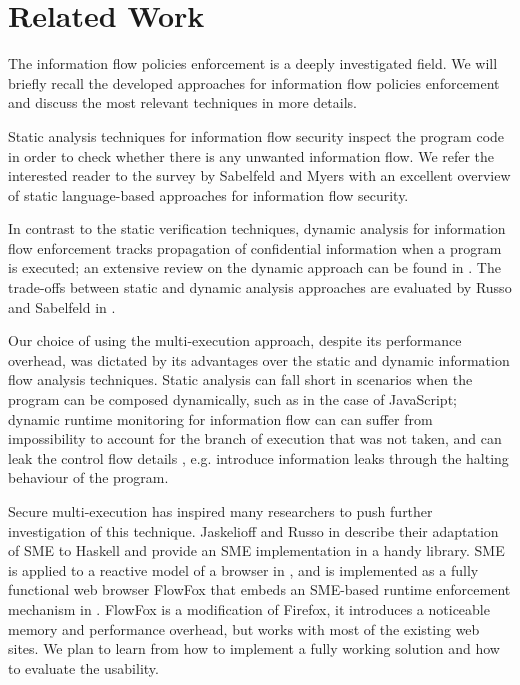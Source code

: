 \documentclass[10pt,a4paper,oneside]{article}
\begin{document}
\section{Related Work}\label{sec:relwork}
The information flow policies enforcement is a deeply investigated field. We will briefly recall the developed approaches for information flow policies enforcement and discuss the most relevant techniques in more details.

Static analysis techniques for information flow security inspect the program code in order to check whether there is any unwanted information flow. We refer the interested reader to the survey by Sabelfeld and Myers \cite{Sabe-Myer-2003} with an excellent overview of static language-based approaches for information flow security.








In contrast to the static verification techniques, dynamic analysis for information flow enforcement tracks propagation of confidential information when a program is executed;  an extensive review on the dynamic approach can be found in \cite{LeGu-07}. The trade-offs between static and dynamic analysis approaches are evaluated by Russo and Sabelfeld in \cite{Russ-Sabe-10-CSF}. 







Our choice of using the multi-execution approach, despite its performance overhead, was dictated by its advantages over the static and dynamic information flow analysis techniques. Static analysis can fall short in scenarios when the program can be composed dynamically, such as in the case of JavaScript; dynamic runtime monitoring for information flow can can suffer from impossibility to account for the branch of execution that was not taken, and can leak the control flow details \cite{Sabe-Myer-2003}, e.g. introduce information leaks through the halting behaviour of the program. 


Secure multi-execution \cite{Devr-Pies-10-IEEESP} has inspired many researchers to push further investigation of this technique. Jaskelioff and Russo in \cite{Jask-Russ-2012} describe their adaptation of SME to Haskell and provide an SME implementation in a handy library. SME is applied to a reactive model of a browser in \cite{Biel-etal-11-NSS}, and is implemented as a fully functional web browser FlowFox that embeds an SME-based runtime enforcement mechanism  in \cite{DeGroef-etal-12-CCS}. FlowFox is a modification of Firefox, it introduces a noticeable memory and performance overhead, but works with most of the existing web sites. We plan to learn from \cite{DeGroef-etal-12-CCS} how to implement a fully working solution and how to evaluate the usability.
\end{document}
